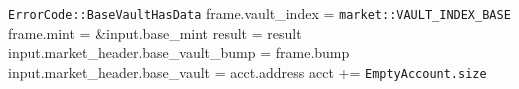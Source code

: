 \begin{algorithm}
\begin{algorithmic}
  \ENDIF
    \RETURN \texttt{ErrorCode::BaseVaultHasData}
  \ENDIF
  \STATE frame.vault\_index = \texttt{market::VAULT\_INDEX\_BASE}
  \STATE frame.mint = \&input.base\_mint
  \STATE result = 
    \RETURN result
  \ENDIF
  \STATE input.market\_header.base\_vault\_bump = frame.bump
  \STATE input.market\_header.base\_vault = acct.address
  \STATE acct += \texttt{EmptyAccount.size}
\ENDPROCEDURE
\end{algorithmic}
\end{algorithm}

